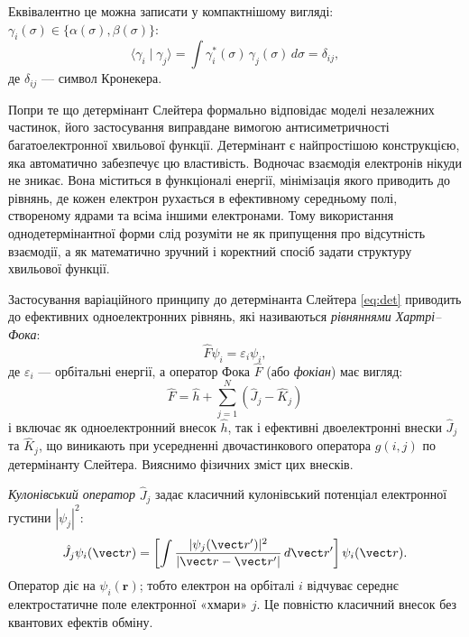 Еквівалентно це можна записати у компактнішому вигляді:
$\gamma_i(\sigma) \in \{\alpha(\sigma),\beta(\sigma)\}$:
\begin{equation}\label{eq:gamma_ortho}
	\langle \gamma_i \mid \gamma_j \rangle
	= \int \gamma_i^*(\sigma)\,\gamma_j(\sigma)\, d\sigma
	= \delta_{ij},
\end{equation}
де $\delta_{ij}$ --- символ Кронекера.


\begin{commentbox}
	Попри те що детермінант Слейтера формально відповідає моделі незалежних частинок, його застосування виправдане вимогою антисиметричності багатоелектронної хвильової функції. Детермінант є найпростішою конструкцією, яка автоматично забезпечує цю властивість.
	Водночас взаємодія електронів нікуди не зникає. Вона міститься в функціоналі енергії, мінімізація якого приводить до рівнянь, де кожен електрон рухається в ефективному середньому полі, створеному ядрами та всіма іншими електронами.
	Тому використання однодетермінантної форми слід розуміти не як припущення про відсутність взаємодії, а як математично зручний і коректний спосіб задати структуру хвильової функції.
\end{commentbox}

Застосування варіаційного принципу до детермінанта Слейтера \eqref{eq:det}  приводить до
ефективних одноелектронних рівнянь, які називаються \emph{рівняннями Хартрі–Фока}:
\begin{equation}\label{eq:HF}
	\hat{F} \psi_i = \varepsilon_i \psi_i,
\end{equation}
де \(\varepsilon_i\) --- орбітальні енергії, а оператор Фока $\hat{F}$ (або \emph{фокіан}) має вигляд:
\begin{equation}\label{eq:fockian}
	\hat{F} = \hat{h} + \sum_{j=1}^{N} (\hat{J}_j - \hat{K}_j)
\end{equation}
і включає як одноелектронний внесок $\hat h$, так і
ефективні двоелектронні внески $\hat J_j$ та $\hat K_j$,
що виникають при усередненні двочастинкового оператора $g(i,j)$
по детермінанту Слейтера. Вияснимо фізичних зміст цих внесків.

\emph{Кулонівський оператор} \(\hat J_j\) задає класичний кулонівський потенціал електронної густини \(|\psi_j|^2\):
\begin{equation}\label{eq:J_operator}
	\hat J_j \psi_i(\vect r)
	= \left[
		\int \frac{|\psi_j(\vect r')|^2}
		{|\vect r - \vect r'|}\, d\vect r'
		\right]\psi_i(\vect r).
\end{equation}
Оператор діє на \(\psi_i(\mathbf r)\); тобто електрон на орбіталі \(i\)
відчуває середнє електростатичне поле електронної «хмари» \(j\).
Це повністю класичний внесок без квантових ефектів обміну.

